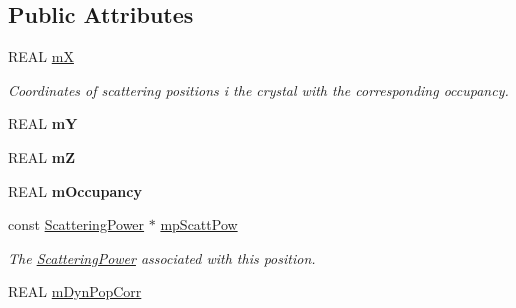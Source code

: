 \subsection*{Public Attributes}
\begin{DoxyCompactItemize}
\item 
\mbox{\label{struct_obj_cryst_1_1_scattering_component_a5e298bbfa80dc72cbf666bd8007c1a58}} 
R\+E\+AL \mbox{\hyperlink{struct_obj_cryst_1_1_scattering_component_a5e298bbfa80dc72cbf666bd8007c1a58}{mX}}
\begin{DoxyCompactList}\small\item\em Coordinates of scattering positions i the crystal with the corresponding occupancy. \end{DoxyCompactList}\item 
\mbox{\label{struct_obj_cryst_1_1_scattering_component_a0ad9f5614c3240d3b97310da61180a48}} 
R\+E\+AL {\bfseries mY}
\item 
\mbox{\label{struct_obj_cryst_1_1_scattering_component_a6e3cf2fb825a1a6912bf9cebc62d4cf7}} 
R\+E\+AL {\bfseries mZ}
\item 
\mbox{\label{struct_obj_cryst_1_1_scattering_component_a845b921b1d5945619b5bfcb87264c125}} 
R\+E\+AL {\bfseries m\+Occupancy}
\item 
\mbox{\label{struct_obj_cryst_1_1_scattering_component_a1aa0c754e20ac3a0489ed57c0cb31bd3}} 
const \mbox{\hyperlink{class_obj_cryst_1_1_scattering_power}{Scattering\+Power}} $\ast$ \mbox{\hyperlink{struct_obj_cryst_1_1_scattering_component_a1aa0c754e20ac3a0489ed57c0cb31bd3}{mp\+Scatt\+Pow}}
\begin{DoxyCompactList}\small\item\em The \mbox{\hyperlink{class_obj_cryst_1_1_scattering_power}{Scattering\+Power}} associated with this position. \end{DoxyCompactList}\item 
R\+E\+AL \mbox{\hyperlink{struct_obj_cryst_1_1_scattering_component_a33af12bb3f340af259a8b8450f837efd}{m\+Dyn\+Pop\+Corr}}
\end{DoxyCompactItemize}


